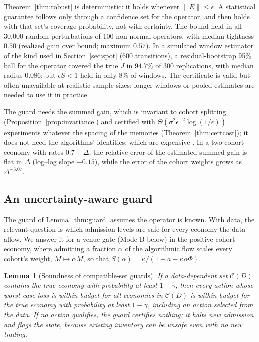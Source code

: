 \documentclass[12pt]{article}
\newtheorem{lemma}[theorem]{Lemma}
\theoremstyle{definition}
\theoremstyle{remark}
\begin{document}
Theorem~\ref{thm:robust} is deterministic: it holds whenever $\|E\|\le\epsilon$. A statistical guarantee follows only through a confidence set for the operator, and then holds with that set's coverage probability, not with certainty. The bound held in all 30,000 random perturbations of 100 non-normal operators, with median tightness $0.50$ (realized gain over bound; maximum $0.57$). In a simulated window estimator of the kind used in Section~\ref{sec:spot} (600 transitions), a residual-bootstrap 95\% ball for the operator covered the true $J$ in $94.7\%$ of 300 replications, with median radius $0.086$; but $\epsilon S<1$ held in only $8\%$ of windows. The certificate is valid but often unavailable at realistic sample sizes; longer windows or pooled estimates are needed to use it in practice.

The guard needs the summed gain, which is invariant to cohort splitting (Proposition~\ref{prop:invariance}) and certified with $\Theta(\sigma^2\epsilon^{-2}\log(1/\epsilon))$ experiments whatever the spacing of the memories (Theorem~\ref{thm:certcost}); it does not need the algorithms' identities, which are expensive \citep{niroula2026}. In a two-cohort economy with rates $0.7\pm\Delta$, the relative error of the estimated summed gain is flat in $\Delta$ (log--log slope $-0.15$), while the error of the cohort weights grows as $\Delta^{-3.07}$.


\subsection{An uncertainty-aware guard}\label{sec:robustguard}
The guard of Lemma~\ref{thm:guard} assumes the operator is known. With data, the relevant question is which admission levels are safe for every economy the data allow. We answer it for a venue gate (Mode B below) in the positive cohort economy, where admitting a fraction $\alpha$ of the algorithmic flow scales every cohort's weight, $M\mapsto\alpha M$, so that $S(\alpha)=\kappa/(1-a-\kappa\alpha\Phi)$.

\begin{lemma}[Soundness of compatible-set guards]\label{lem:sound}
If a data-dependent set $\mathcal C(D)$ contains the true economy with probability at least $1-\gamma$, then every action whose worst-case loss is within budget for all economies in $\mathcal C(D)$ is within budget for the true economy with probability at least $1-\gamma$, including an action selected from the data. If no action qualifies, the guard certifies nothing: it halts new admission and flags the state, because existing inventory can be unsafe even with no new trading.
\end{lemma}
\end{document}
